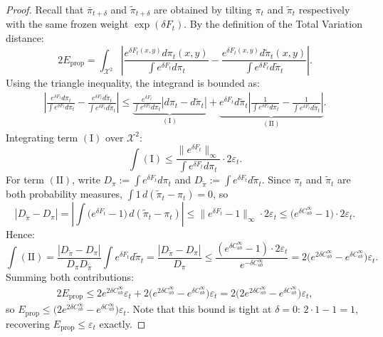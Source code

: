 \documentclass[11pt]{article}
\theoremstyle{definition}
\numberwithin{equation}{section}%
\begin{document}
{\begin{proof}
Recall that $\bar{\pi}_{t+\delta}$ and $\tilde{\pi}_{t+\delta}$ are obtained by tilting $\pi_t$ and $\tilde{\pi}_t$ respectively with the same frozen weight $\exp(\delta F_t)$. By the definition of the Total Variation distance:
\begin{equation}
\label{eq:prop_tv_start}
2 E_{\mathrm{prop}} = \int_{\mathcal{X}^2} \left| \frac{e^{\delta F_t(x,y)} d\pi_t(x,y)}{\int e^{\delta F_t} d\pi_t} - \frac{e^{\delta F_t(x,y)} d\tilde{\pi}_t(x,y)}{\int e^{\delta F_t} d\tilde{\pi}_t} \right|.
\end{equation}
Using the triangle inequality, the integrand is bounded as:
\begin{align*}
\left| \frac{e^{\delta F_t} d\pi_t}{\int e^{\delta F_t} d\pi_t} - \frac{e^{\delta F_t} d\tilde{\pi}_t}{\int e^{\delta F_t} d\tilde{\pi}_t} \right| \le \underbrace{\frac{e^{\delta F_t}}{\int e^{\delta F_t} d\pi_t} |d\pi_t - d\tilde{\pi}_t|}_{(\mathrm{I})} + \underbrace{e^{\delta F_t} d\tilde{\pi}_t \left| \frac{1}{\int e^{\delta F_t} d\pi_t} - \frac{1}{\int e^{\delta F_t} d\tilde{\pi}_t} \right|}_{(\mathrm{II})}.
\end{align*}
Integrating term $(\mathrm{I})$ over $\mathcal{X}^2$:
\[
\int(\mathrm{I}) \le \frac{\|e^{\delta F_t}\|_\infty}{\int e^{\delta F_t} d\pi_t}\cdot 2\varepsilon_t.
\]
For term $(\mathrm{II})$, write $D_\pi := \int e^{\delta F_t} d\pi_t$ and $D_{\tilde\pi} := \int e^{\delta F_t} d\tilde\pi_t$. Since $\pi_t$ and $\tilde\pi_t$ are both probability measures, $\int 1\,d(\tilde\pi_t - \pi_t) = 0$, so
\[
|D_{\tilde\pi} - D_\pi|
= \left|\int \bigl(e^{\delta F_t}-1\bigr)\,d(\tilde\pi_t-\pi_t)\right|
\le \|e^{\delta F_t}-1\|_\infty \cdot 2\varepsilon_t
\le \bigl(e^{\delta C_{ab}^\infty}-1\bigr)\cdot 2\varepsilon_t.
\]
Hence:
\[
\int(\mathrm{II})
= \frac{|D_{\tilde\pi} - D_\pi|}{D_\pi D_{\tilde\pi}}\int e^{\delta F_t}d\tilde\pi_t
= \frac{|D_{\tilde\pi}-D_\pi|}{D_\pi}
\le \frac{(e^{\delta C_{ab}^\infty}-1)\cdot 2\varepsilon_t}{e^{-\delta C_{ab}^\infty}}
= 2\bigl(e^{2\delta C_{ab}^\infty}-e^{\delta C_{ab}^\infty}\bigr)\varepsilon_t.
\]
Summing both contributions:
\begin{align*}
2 E_{\mathrm{prop}}
\le 2e^{2\delta C_{ab}^\infty}\varepsilon_t + 2\bigl(e^{2\delta C_{ab}^\infty}-e^{\delta C_{ab}^\infty}\bigr)\varepsilon_t
= 2\bigl(2e^{2\delta C_{ab}^\infty}-e^{\delta C_{ab}^\infty}\bigr)\varepsilon_t,
\end{align*}
so $E_{\mathrm{prop}} \le \bigl(2e^{2\delta C_{ab}^\infty}-e^{\delta C_{ab}^\infty}\bigr)\varepsilon_t$.
Note that this bound is tight at $\delta=0$: $2\cdot 1 - 1 = 1$, recovering $E_{\mathrm{prop}} \le \varepsilon_t$ exactly.


\end{proof}}
\end{document}
